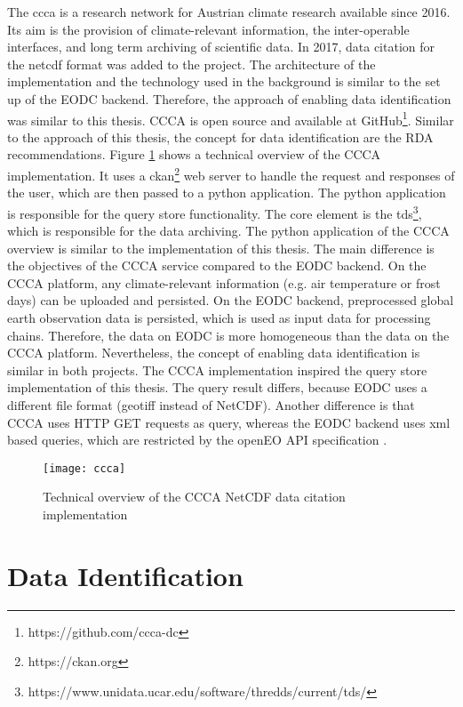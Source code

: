 \documentclass[draft,final]{vutinfth} %
\begin{document}
The \gls{ccca} is a research network for Austrian climate research available since 2016. Its aim is the provision of climate-relevant information, the inter-operable interfaces, and long term archiving of scientific data. In 2017, data citation for the \gls{netcdf} format was added to the project. The architecture of the implementation and the technology used in the background is similar to the set up of the EODC backend. Therefore, the approach of enabling data identification was similar to this thesis. CCCA is open source and available at GitHub\footnote{https://github.com/ccca-dc}. Similar to the approach of this thesis, the concept for data identification are the RDA recommendations. Figure \ref{fig:ccca} shows a technical overview of the CCCA implementation. It uses a ckan\footnote{https://ckan.org} web server to handle the request and responses of the user, which are then passed to a python application. The python application is responsible for the query store functionality. The core element is the \gls{tds}\footnote{https://www.unidata.ucar.edu/software/thredds/current/tds/}, which is responsible for the data archiving.   
The python application of the CCCA overview is similar to the implementation of this thesis. The main difference is the objectives of the CCCA service compared to the EODC backend. On the CCCA platform, any climate-relevant information (e.g. air temperature or frost days) can be uploaded and persisted. On the EODC backend, preprocessed global earth observation data is persisted, which is used as input data for processing chains. Therefore, the data on EODC is more homogeneous than the data on the CCCA platform.
Nevertheless, the concept of enabling data identification is similar in both projects. The CCCA implementation inspired the query store implementation of this thesis. The query result differs, because EODC uses a different file format (\gls{geotiff} instead of NetCDF). Another difference is that CCCA uses HTTP GET requests as query, whereas the EODC backend uses \gls{xml} based queries, which are restricted by the openEO API specification \cite{ccca}.  

\begin{figure}[h]
	\centering
	\texttt{[image: ccca]}
	\caption{Technical overview of the CCCA NetCDF data citation implementation}
	\label{fig:ccca} %
\end{figure}

\section{Data Identification}\label{Data Identification}
\end{document}
